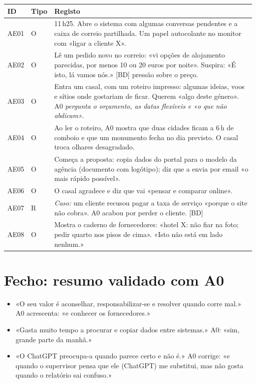 \documentclass[11pt,a4paper]{article}
\newcommand{\bolt}{\textcolor{alerta}{[BD]}}
\begin{document}
{\small
\begin{longtable}{@{}p{1.1cm}p{0.7cm}p{13.4cm}@{}}
\toprule
\textbf{ID} & \textbf{Tipo} & \textbf{Registo} \\ \midrule \endhead
AE01 & O & 11\,h25. Abre o sistema com algumas conversas pendentes e a caixa de correio 
partilhada. Um papel autocolante no monitor 
com «ligar a cliente X». \\

AE02 & O & Lê um pedido novo no correio: «vi opções de alojamento parecidas,
por menos 10 ou 20 euros por noite». Suspira: «É isto, lá vamos nós.» \bolt{} 
pressão sobre o preço. \\

AE03 & O & Entra um casal, com um roteiro impresso: algumas ideias, voos
e sítios onde gostariam de ficar. Querem «algo deste género». 
A0 \emph{pergunta o orçamento, as datas flexíveis e «o que não abdicam»}. \\

AE04 & O & Ao ler o roteiro, A0 mostra que duas cidades ficam a 6\,h de comboio e 
que um monumento fecha no dia previsto. O casal troca olhares desagradado. \\


AE05 & O & Começa a proposta: copia dados do portal para o modelo da agência 
(documento com logótipo); diz que a envia por email «o mais rápido possível». \\

AE06 & O & O casal agradece e diz que vai «pensar e comparar online». \\

AE07 & R & \textit{Caso:} um cliente recusou pagar a taxa de serviço
«porque o site não cobra». A0 acabou por perder o cliente. \bolt{} \\

AE08 & O & Mostra o caderno de fornecedores: «hotel X: não fiar na foto; pedir 
quarto nos pisos de cima». «Isto não está em lado nenhum.» \\

\bottomrule
\end{longtable}}

\section{Fecho: resumo validado com A0}
\begin{itemize}
  \item «O seu valor é aconselhar, responsabilizar-se e resolver quando corre mal.» 
  A0 acrescenta: «e conhecer os fornecedores.»
  \item «Gasta muito tempo a procurar e copiar dados entre sistemas.» A0: 
  «sim, grande parte da manhã.»
  \item «O ChatGPT preocupa-a quando parece certo e não é.» A0 corrige: «e quando o 
  supervisor pensa que ele (ChatGPT) me substitui, mas não gosta quando o relatório
  sai confuso.»
\end{itemize}
\end{document}
